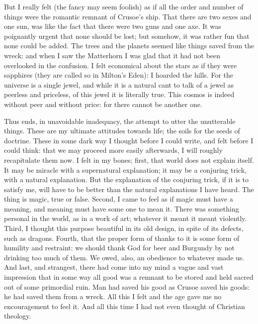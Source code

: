 But I really felt (the fancy may seem foolish) as if all the order and number of things were the romantic remnant of Crusoe’s ship. That there are two sexes and one sun, was like the fact that there were two guns and one axe. It was poignantly urgent that none should be lost; but somehow, it was rather fun that none could be added. The trees and the planets seemed like things saved from the wreck: and when I saw the Matterhorn I was glad that it had not been overlooked in the confusion. I felt economical about the stars as if they were sapphires (they are called so in Milton’s Eden): I hoarded the hills. For the universe is a single jewel, and while it is a natural cant to talk of a jewel as peerless and priceless, of this jewel it is literally true. This cosmos is indeed without peer and without price: for there cannot be another one.

Thus ends, in unavoidable inadequacy, the attempt to utter the unutterable things. These are my ultimate attitudes towards life; the soils for the seeds of doctrine. These in some dark way I thought before I could write, and felt before I could think: that we may proceed more easily afterwards, I will roughly recapitulate them now. I felt in my bones; first, that world does not explain itself. It may be miracle with a supernatural explanation; it may be a conjuring trick, with a natural explanation. But the explanation of the conjuring trick, if it is to satisfy me, will have to be better than the natural explanations I have heard. The thing is magic, true or false. Second, I came to feel as if magic must have a meaning, and meaning must have some one to mean it. There was something personal in the world, as in a work of art; whatever it meant it meant violently. Third, I thought this purpose beautiful in its old design, in spite of its defects, such as dragons. Fourth, that the proper form of thanks to it is some form of humility and restraint: we should thank God for beer and Burgundy by not drinking too much of them. We owed, also, an obedience to whatever made us. And last, and strangest, there had come into my mind a vague and vast impression that in some way all good was a remnant to be stored and held sacred out of some primordial ruin. Man had saved his good as Crusoe saved his goods: he had saved them from a wreck. All this I felt and the age gave me no encouragement to feel it. And all this time I had not even thought of Christian theology.


